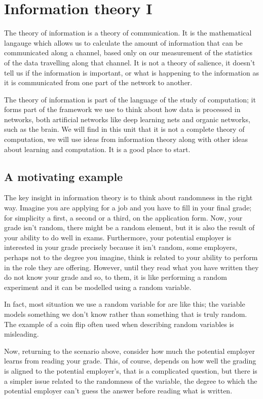 \documentclass[12pt]{article}
\begin{document}
\section*{Information theory I} 

The theory of information is a theory of communication. It is the
mathematical langauge which allows us to calculate the amount of
information that can be communicated along a channel, based only on
our measurement of the statistics of the data travelling along that
channel. It is not a theory of salience, it doesn't tell us if the
information is important, or what is happening to the information as
it is communicated from one part of the network to another.

The theory of information is part of the language of the study of
computation; it forms part of the framework we use to think about how
data is processed in networks, both artificial networks like deep
learning nets and organic networks, such as the brain. We will find in
this unit that it is not a complete theory of computation, we will use
ideas from information theory along with other ideas about learning
and computation. It is a good place to start.

\subsection*{A motivating example}

The key insight in information theory is to think about randomness in
the right way. Imagine you are applying for a job and you have to fill
in your final grade; for simplicity a first, a second or a third, on
the application form. Now, your grade isn't random, there might be a
random element, but it is also the result of your ability to do well
in exams. Furthermore, your potential employer is interested in your
grade precisely because it isn't random, some employers, perhaps not
to the degree you imagine, think is related to your ability to perform
in the role they are offering. However, until they read what you have
written they do not know your grade and so, to them, it is like
performing a random experiment and it can be modelled using a random
variable.

In fact, most situation we use a random variable for are like this;
the variable models something we don't know rather than something that
is truly random. The example of a coin flip often used when describing
random variables is misleading.

Now, returning to the scenario above, consider how much the potential
employer learns from reading your grade. This, of course, depends on
how well the grading is aligned to the potential employer's, that is a
complicated question, but there is a simpler issue related to the
randomness of the variable, the degree to which the potential employer
can't guess the answer before reading what is written. 
\end{document}
